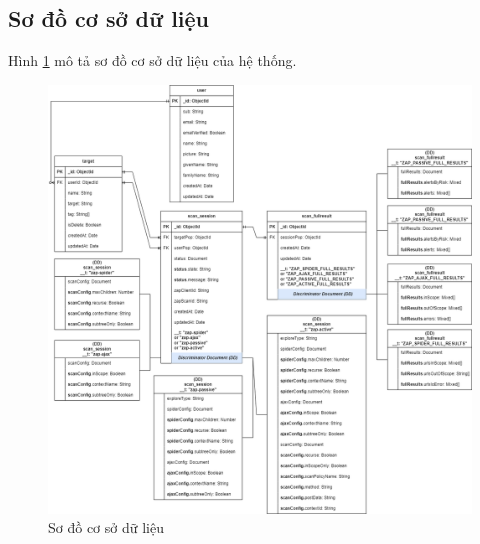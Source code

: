 \newpage
\subsection{Sơ đồ cơ sở dữ liệu}

Hình \ref{fig:Database} mô tả sơ đồ cơ sở dữ liệu của hệ thống.

\begin{figure}[H]
      \centering
      \includegraphics[width=\textwidth]{applied-thesis-chapters/chapter-3/Sơ đồ cơ sở dữ liệu.png}
      \caption{Sơ đồ cơ sở dữ liệu}
      \label{fig:Database}
\end{figure}
